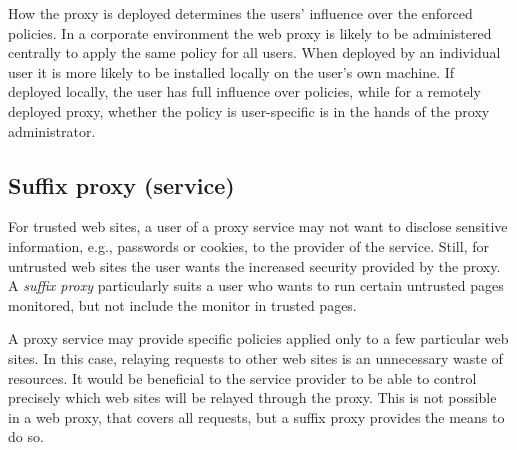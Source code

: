 \documentclass{llncs}
\newcommand{\todo}[1]{\colorbox{red}{\textcolor{white}{\sffamily\bfseries\scriptsize TODO}} \textcolor{red}{#1} \textcolor{red}{$\blacktriangleleft$}}
\begin{document}
How the proxy is 
deployed determines the users' influence over 
the enforced policies.
In a corporate environment the web proxy is likely to be 
administered centrally to apply the same policy for all users. When deployed by 
an individual user it is more likely to be installed locally on the user's own machine.
If deployed locally, the user has full influence over 
policies, while for a remotely deployed proxy,
whether the policy is user-specific is 
in the hands of the proxy administrator. 






\subsection{Suffix proxy (service)}
\label{sec:arch-suffix}


For trusted web sites, a user of a proxy service may not want to disclose
sensitive information, e.g., passwords or cookies, to the provider of the service.
Still, for untrusted web sites the user wants the increased security provided 
by the proxy.
A \emph{suffix proxy} particularly suits a user who wants to run certain untrusted 
pages monitored, but not include the monitor in trusted pages.


A proxy service may provide specific policies applied only to a few 
particular web sites. In this case, relaying requests to other web sites is an 
unnecessary waste of resources. It would be beneficial to the service provider to be
able to control precisely which web sites will be relayed through the proxy. 
This is not possible in a web proxy, that covers all requests, but a suffix proxy 
provides the means to do so.
\end{document}
